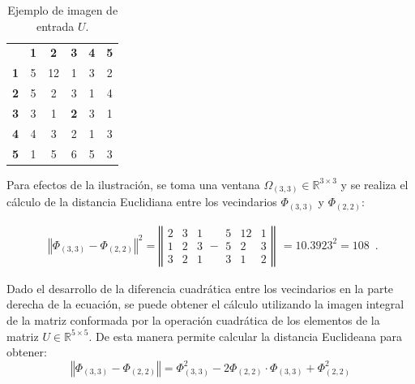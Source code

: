\begin{table}
\begin{center}
\caption{Ejemplo de imagen de entrada $U$.\label{table:imageExample}}

\renewcommand{\arraystretch}{1.4}
\setlength\tabcolsep{3pt}

{
\begin{tabular}{cc|ccc|c}
 & \multicolumn{1}{c}{\textbf{1}} & \textbf{2} & \textbf{3} & \multicolumn{1}{c}{\textbf{4}} & \textbf{5}\tabularnewline
\textbf{1} & \multicolumn{1}{c}{5} & 12 & 1 & \multicolumn{1}{c}{3} & 2\tabularnewline
\cline{3-5} 
\textbf{2} & 5 & 2 & 3 & 1 & 4\tabularnewline
\textbf{3} & 3 & 1 & \textbf{2} & 3 & 1\tabularnewline
\textbf{4} & 4 & 3 & 2 & 1 & 3\tabularnewline
\cline{3-5} 
\textbf{5} & \multicolumn{1}{c}{1} & 5 & 6 & \multicolumn{1}{c}{5} & 3\tabularnewline
\end{tabular}
}
\par\end{center} 
\end{table}




Para efectos de la ilustraci\'on, se toma una ventana $\Omega_{\left(3,3\right)}\in\mathbb{R}^{3\times3}$  y se realiza  el c\'alculo de la distancia Euclidiana entre los vecindarios $\varPhi_{\left(3,3\right)}$ y $\varPhi_{\left(2,2\right)}$:

\begin{equation}
\label{eq:resultado1}
\begin{array}{c}
\left\Vert \varPhi_{\left(3,3\right)}-\varPhi_{\left(2,2\right)}\right\Vert ^{2}=\left\Vert \begin{array}{ccc}
2 & 3 & 1\\
1 & 2 & 3\\
3 & 2 & 1
\end{array}-\begin{array}{ccc}
5 & 12 & 1\\
5 & 2 & 3\\
3 & 1 & 2
\end{array}\right\Vert\end{array}
=10.3923^{2}=108 \enspace .
\end{equation}



 Dado el desarrollo de la diferencia cuadr\'atica entre los vecindarios en la parte derecha de la ecuaci\'on, se puede obtener el c\'alculo utilizando la imagen integral de la matriz conformada por la operaci\'on cuadr\'atica de los elementos de la matriz $U\in\mathbb{R}^{5\times5}$. De esta manera permite calcular la distancia Euclideana para obtener: 
\begin{equation}
\left\Vert \varPhi_{\left(3,3\right)}-\varPhi_{\left(2,2\right)}\right\Vert =\varPhi_{\left(3,3\right)}^{2}-2\varPhi_{\left(2,2\right)}\cdot\varPhi_{\left(3,3\right)}+\varPhi_{\left(2,2\right)}^{2} 
\end{equation}


